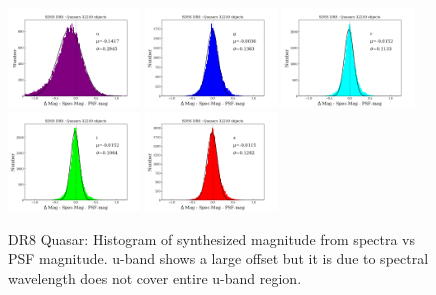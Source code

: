 \documentclass[apj,twocolumn]{aastex631}
\begin{document}
\begin{figure}%
\begin{center}
\includegraphics[angle=0,width=3.5cm]{figures/20220811_dmag_histogram_u_dr8quasars.png}
\includegraphics[angle=0,width=3.5cm]{figures/20220811_dmag_histogram_g_dr8quasars.png}
\includegraphics[angle=0,width=3.5cm]{figures/20220811_dmag_histogram_r_dr8quasars.png}
\includegraphics[angle=0,width=3.5cm]{figures/20220811_dmag_histogram_i_dr8quasars.png}
\includegraphics[angle=0,width=3.5cm]{figures/20220811_dmag_histogram_z_dr8quasars.png}
\caption{DR8 Quasar: Histogram of synthesized magnitude from spectra vs PSF magnitude.
u-band shows a large offset but it is due to spectral wavelength does not cover entire u-band region.}
\end{center}
\end{figure}
\end{document}
